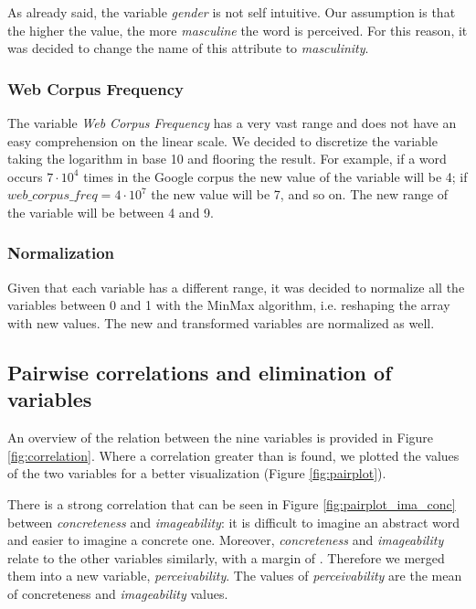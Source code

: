 \documentclass[a4paper,11pt,dvipsnames]{article}
\begin{document}
As already said, the variable \textit{gender} is not self intuitive.  Our assumption is that  the  higher  the  value,  the  more \textit{masculine} the word is perceived. For this reason, it was decided to change the name of this attribute to \textit{masculinity}.

\subsubsection{Web Corpus Frequency}\label{discretize}

The variable \textit{Web Corpus Frequency} has a very vast range and does not have an easy comprehension on the linear scale. We decided to discretize the variable taking the logarithm in base 10 and flooring the result. For example, if a word occurs $7\cdot10^4$ times in the Google corpus the new value of the variable will be 4; if $web\_corpus\_freq=4\cdot 10^7$ the new value will be 7, and so on. The new range of the variable will be between 4 and 9. 

\subsubsection{Normalization}\label{normalization}

Given that each variable has a different range, it was decided to normalize all the variables between 0 and 1 with the MinMax algorithm, i.e. reshaping the array with new values. The new and transformed variables are normalized as well.



\subsection[Pairwise correlations]{Pairwise correlations and elimination of variables}
An overview of the relation between the nine variables is provided in Figure \ref{fig:correlation}. Where a correlation greater than \textbar{} is found, we plotted the values of the two variables for a better visualization (Figure \ref{fig:pairplot}). 

There is a strong correlation that can be seen in Figure \ref{fig:pairplot_ima_conc} between \textit{concreteness} and \textit{imageability}: it is difficult to imagine an abstract word and easier to imagine a concrete one.  Moreover, \textit{concreteness} and \textit{imageability} relate to the other variables similarly, with a margin of . Therefore we merged them into a new variable, \textit{perceivability}. The values of \textit{perceivability} are the mean of concreteness and \textit{imageability} values. 
\end{document}
